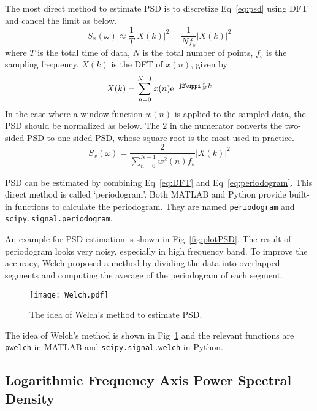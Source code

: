 The most direct method to estimate PSD is to discretize Eq~\eqref{eq:psd} using DFT and cancel the limit as below.
\begin{equation}
    S_x(\omega) \approx \frac{1}{T} \left| X(k) \right|^2 = \frac{1}{Nf_s} \left| X(k) \right|^2
\end{equation}
where $T$ is the total time of data, $N$ is the total number of points, $f_s$ is the sampling frequency. $X(k)$ is the DFT of $x(n)$, given by
\begin{equation}
    X(k) = \sum_{n=0}^{N-1} x(n) \iexp{-\mathrm{j} 2 \uppi \frac{n}{N}k} \label{eq:DFT}
\end{equation}
In the case where a window function $w(n)$ is applied to the sampled data, the PSD should be normalized as below. The $2$ in the numerator converts the two-sided PSD to one-sided PSD, whose square root is the most used in practice.
\begin{equation}
    S_x(\omega) = \frac{2}{\sum_{n=0}^{N-1} w^2(n) f_s} \left| X(k) \right|^2 \label{eq:periodogram}
\end{equation}


PSD can be estimated by combining Eq~\eqref{eq:DFT} and Eq~\eqref{eq:periodogram}. This direct method is called `periodogram'. Both MATLAB and Python provide built-in functions to calculate the periodogram. They are named \verb|periodogram| and \verb|scipy.signal.periodogram|. 


An example for PSD estimation is shown in Fig~\ref{fig:plotPSD}. The result of periodogram looks very noisy, especially in high frequency band. To improve the accuracy, Welch proposed a method by dividing the data into overlapped segments and computing the average of the periodogram of each segment.


\begin{figure}[!htb]
    \centering
    \texttt{[image: Welch.pdf]}
    \caption{The idea of Welch's method to estimate PSD.}
    \label{fig:Welch}
\end{figure}


The idea of Welch's method is shown in Fig~\ref{fig:Welch} and the relevant functions are \verb|pwelch| in MATLAB and \verb|scipy.signal.welch| in Python. 




\subsection{Logarithmic Frequency Axis Power Spectral Density}


